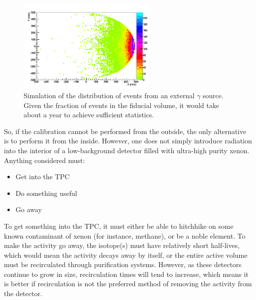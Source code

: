 \documentclass[phys,dissertation]{puthesis}
\begin{document}
\begin{figure}[htb]
\centering
\includegraphics[trim = 0 0 0 0, clip = true, width = 0.6\textwidth]{figures/chapter_five/externalsource_dark_nostats.png}
\caption{Simulation of the distribution of events from an external $\gamma$ source. Given the fraction of events in the fiducial volume, it would take about a year to achieve sufficient statistics.}
\label{fig:externalsource}
\end{figure}

So, if the calibration cannot be performed from the outside, the only alternative is to perform it from the inside. However, one does not simply introduce radiation into the interior of a low-background detector filled with ultra-high purity xenon. Anything considered must:
\begin{itemize}
\item Get into the TPC
\item Do something useful
\item Go away
\end{itemize}

To get something into the TPC, it must either be able to hitchhike on some known contaminant of xenon (for instance, methane), or be a noble element. To make the activity go away, the isotope(s) must have relatively short half-lives, which would mean the activity decays away by itself, or the entire active volume must be recirculated through purification systems. However, as these detectors continue to grow in size, recirculation times will tend to increase, which means it is better if recirculation is not the preferred method of removing the activity from the detector.
\end{document}
